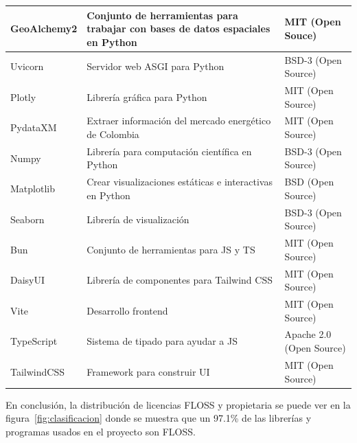 \begin{longtable}{|p{}|p{}|p{}|}
  GeoAlchemy2 & Conjunto de herramientas para trabajar con bases de datos espaciales en Python & MIT (Open Souce)\cite{geoalchemy2} \\ \hline

  Uvicorn & Servidor web ASGI para Python & BSD-3 (Open Source)\cite{uvicorn} \\ \hline

  Plotly & Librería gráfica para Python & MIT (Open Source)\cite{plotly_py} \\ \hline

  PydataXM & Extraer información del mercado energético de Colombia & MIT (Open Source)\cite{api_xm} \\ \hline

  Numpy & Librería para computación científica en Python & BSD-3 (Open Source)\cite{numpy_org} \\ \hline

  Matplotlib & Crear visualizaciones estáticas e interactivas en Python & BSD (Open Source)\cite{matplotlib_license} \\ \hline

  Seaborn & Librería de visualización & BSD-3 (Open Source)\cite{seaborn_github} \\ \hline

  Bun & Conjunto de herramientas para JS y TS & MIT (Open Source)\cite{bun_github} \\ \hline

  DaisyUI & Librería de componentes para Tailwind CSS & MIT (Open Source)\cite{daisyui_github} \\ \hline

  Vite & Desarrollo frontend & MIT (Open Source)\cite{vite_github} \\ \hline

  TypeScript & Sistema de tipado para ayudar a JS & Apache 2.0 (Open Source)\cite{typescript_github} \\ \hline

  TailwindCSS & Framework para construir UI & MIT (Open Source)\cite{tailwindcss_github} \\ \hline
  
\end{longtable}

En conclusión, la distribución de licencias \acs{FLOSS} y propietaria se puede ver en la figura~\ref{fig:clasificacion} donde se muestra que un 97.1\% de las librerías y programas usados en el proyecto son \acs{FLOSS}.


